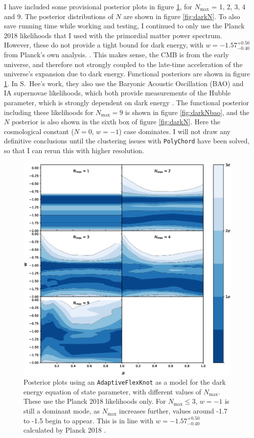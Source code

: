 \documentclass{article}
\begin{document}
I have included some provisional posterior plots in figure \ref{fig:externalwa}, for $N_\textrm{max}$ = 1, 2, 3, 4 and 9. The posterior distributions of $N$ are shown in figure \ref{fig:darkN}. To also save running time while working and testing, I continued to only use the Planck 2018 likelihoods that I used with the primordial matter power spectrum. However, these do not provide a tight bound for dark energy, with $w=-1.57_{-0.40}^{+0.50}$ from Planck's own analysis. \cite{planck_6}. This makes sense, the CMB is from the early universe, and therefore not strongly coupled to the late-time acceleration of the universe's expansion due to dark energy. Functional posteriors are shown in figure \ref{fig:externalwa}. In S.~Hee's work, they also use the Baryonic Acoustic Oscillation (BAO) and IA supernovae likelihoods, which both provide measurements of the Hubble parameter, which is strongly dependent on dark energy \cite{Sonke, BAO1, BAO2, BAO3, SNIa}. The functional posterior including these likelihoods for $N_\textrm{max}=9$ is shown in figure \ref{fig:darkNbao}, and the $N$ posterior is also shown in the sixth box of figure \ref{fig:darkN}. Here the cosmological constant ($N=0$, $w=-1$) case dominates. I will not draw any definitive conclusions until the clustering issues with \texttt{PolyChord} have been solved, so that I can rerun this with higher resolution.

\newpage

\begin{figure}[H]
  \centering
  \includegraphics[width=16cm]{adaptivew.eps}
  \caption{Posterior plots using an \texttt{AdaptiveFlexKnot} as a model for the dark energy equation of state parameter, with different values of $N_\textrm{max}$. These use the Planck 2018 likelihoods only. For $N_\textrm{max}\le 3$, $w=-1$ is still a dominant mode, as $N_\textrm{max}$ increases further, values around -1.7 to -1.5 begin to appear. This is in line with $w=-1.57_{-0.40}^{+0.50}$ calculated by Planck 2018 \cite{planck_6}.}
  \label{fig:externalwa}
\end{figure}
\end{document}
